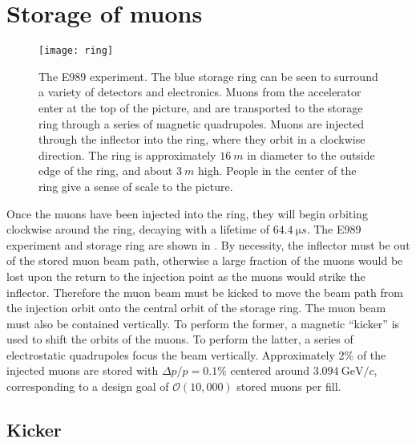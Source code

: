 \section{Storage of muons}
\label{sec:Storage}

\begin{figure}[]
    \centering
    \texttt{[image: ring]}
    \caption[The E989 experiment]{The E989 experiment. The blue storage ring can be seen to surround a variety of detectors and electronics. Muons from the accelerator enter at the top of the picture, and are transported to the storage ring through a series of magnetic quadrupoles. Muons are injected through the inflector into the ring, where they orbit in a clockwise direction. The ring is approximately $\SI{16}{m}$ in diameter to the outside edge of the ring, and about $\SI{3}{m}$ high. People in the center of the ring give a sense of scale to the picture.}
    \label{fig:ring}
\end{figure}


Once the muons have been injected into the ring, they will begin orbiting clockwise around the ring, decaying with a lifetime of $\SI{64.4}{\micro s}$.  The E989 experiment and storage ring are shown in . By necessity, the inflector must be out of the stored muon beam path, otherwise a large fraction of the muons would be lost upon the return to the injection point as the muons would strike the inflector. Therefore the muon beam must be kicked to move the beam path from the injection orbit onto the central orbit of the storage ring. The muon beam must also be contained vertically. To perform the former, a magnetic ``kicker'' is used to shift the orbits of the muons. To perform the latter, a series of electrostatic quadrupoles focus the beam vertically. Approximately 2\% of the injected muons are stored with $\Delta p / p = 0.1\%$ centered around $\SI{3.094}{\GeV/c}$, corresponding to a design goal of $\mathcal{O}(10,000)$ stored muons per fill.


\subsection{Kicker}
\label{sub:kicker}

